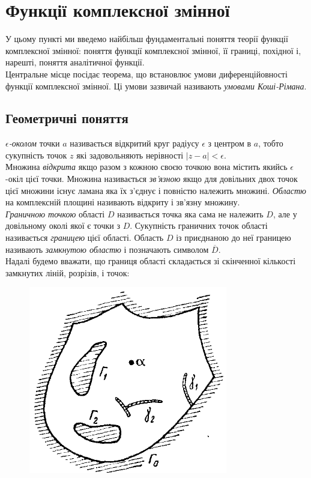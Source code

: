
% 

% 

\setcounter{section}{1}
\section{Функції комплексної змінної}

У цьому пункті ми введемо найбільш фундаментальні поняття теорії функції комплексної змінної: поняття функції комплексної змінної, її границі, похідної і, нарешті, поняття аналітичної функції. \\

Центральне місце посідає теорема, що встановлює умови диференційовності функції комплексної змінної. Ці умови зазвичай називають \textit{умовами Коші-Рімана}.

\subsection{Геометричні поняття}

\textit{$\epsilon$-околом} точки $a$ називається відкритий круг радіусу $\epsilon$ з центром в $a$, тобто сукупність точок $z$ які задовольняють нерівності $|z - a| < \epsilon$. \\

Множина \textit{відкрита} якщо разом з кожною своєю точкою вона містить якийсь $\epsilon$-окіл цієї точки. Множина називається \textit{зв'язною} якщо для довільних двох точок цієї множини існує ламана яка їх з'єднує і повністю належить множині. \textit{Областю} на комплексній площині називають відкриту і зв'язну множину. \\

\textit{Граничною точкою} області $D$ називається точка яка сама не належить $D$, але у довільному околі якої є точки з $D$. Сукупність граничних точок області називається \textit{границею} цієї області. Область $D$ із приєднаною до неї границею називають \textit{замкнутою областю} і позначають символом $\overline{D}$. \\

Надалі будемо вважати, що границя області складається зі скінченної кількості замкнутих ліній, розрізів, і точок:
\begin{figure}[H]
	\centering
	\includegraphics[width=.4\linewidth]{mal-05.png}
	\label{fig:2.1}
\end{figure}

